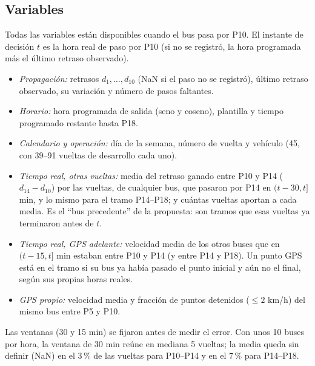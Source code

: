 \documentclass[conference,spanish]{IEEEtran}
\begin{document}
\subsection{Variables}\label{sec:variables}
Todas las variables están disponibles cuando el bus pasa por P10. El instante de decisión $t$ es la hora real de paso por P10 (si no se registró, la hora programada más el último retraso observado).
\begin{itemize}
    \item \emph{Propagación:} retrasos $d_1,\dots,d_{10}$ (NaN si el paso no se registró), último retraso observado, su variación y número de pasos faltantes.
    \item \emph{Horario:} hora programada de salida (seno y coseno), plantilla y tiempo programado restante hasta P18.
    \item \emph{Calendario y operación:} día de la semana, número de vuelta y vehículo (45, con 39--91 vueltas de desarrollo cada uno).
    \item \emph{Tiempo real, otras vueltas:} media del retraso ganado entre P10 y P14 ($d_{14}-d_{10}$) por las vueltas, de cualquier bus, que pasaron por P14 en $(t-30, t]$ min, y lo mismo para el tramo P14--P18; y cuántas vueltas aportan a cada media. Es el ``bus precedente'' de la propuesta: son tramos que esas vueltas ya terminaron antes de $t$.
    \item \emph{Tiempo real, GPS adelante:} velocidad media de los otros buses que en $(t-15, t]$ min estaban entre P10 y P14 (y entre P14 y P18). Un punto GPS está en el tramo si su bus ya había pasado el punto inicial y aún no el final, según sus propias horas reales.
    \item \emph{GPS propio:} velocidad media y fracción de puntos detenidos ($\le2$ km/h) del mismo bus entre P5 y P10.
\end{itemize}
Las ventanas (30 y 15 min) se fijaron antes de medir el error. Con unos 10 buses por hora, la ventana de 30 min reúne en mediana 5 vueltas; la media queda sin definir (NaN) en el 3\,\% de las vueltas para P10--P14 y en el 7\,\% para P14--P18.
\end{document}
